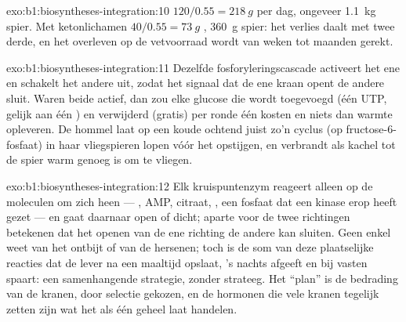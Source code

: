 \begin{solution}{exo:b1:biosyntheses-integration:10}
$120/0.55 = \qty{218}{g}$  per dag, ongeveer \qty{1.1}{kg} spier. Met
ketonlichamen $40/0.55 = \qty{73}{g}$ , \qty{360}{g} spier: het verlies daalt
met twee derde, en het overleven op de vetvoorraad wordt van weken tot maanden
gerekt.
\end{solution}

\begin{solution}{exo:b1:biosyntheses-integration:11}
Dezelfde fosforyleringscascade activeert het ene en schakelt het andere uit, zodat
het signaal dat de ene kraan opent de andere sluit. Waren beide actief, dan zou
elke glucose die wordt toegevoegd (één UTP, gelijk aan één ) en verwijderd
(gratis) per ronde één  kosten en niets dan warmte opleveren. De hommel laat op
een koude ochtend juist zo'n cyclus (op fructose-6-fosfaat) in haar vliegspieren
lopen vóór het opstijgen, en verbrandt  als kachel tot de spier warm genoeg is
om te vliegen.
\end{solution}

\begin{solution}{exo:b1:biosyntheses-integration:12}
Elk kruispuntenzym reageert alleen op de moleculen om zich heen --- , AMP,
citraat, , een fosfaat dat een kinase erop heeft gezet --- en gaat
daarnaar open of dicht; aparte  voor de twee richtingen betekenen dat het
openen van de ene richting de andere kan sluiten. Geen enkel  weet van het
ontbijt of van de hersenen; toch is de som van deze plaatselijke reacties dat de
lever na een maaltijd opslaat, 's nachts afgeeft en bij vasten  spaart: een
samenhangende strategie, zonder strateeg. Het ``plan'' is de bedrading van de
kranen, door selectie gekozen, en de hormonen die vele kranen tegelijk zetten zijn
wat het  als één geheel laat handelen.
\end{solution}

